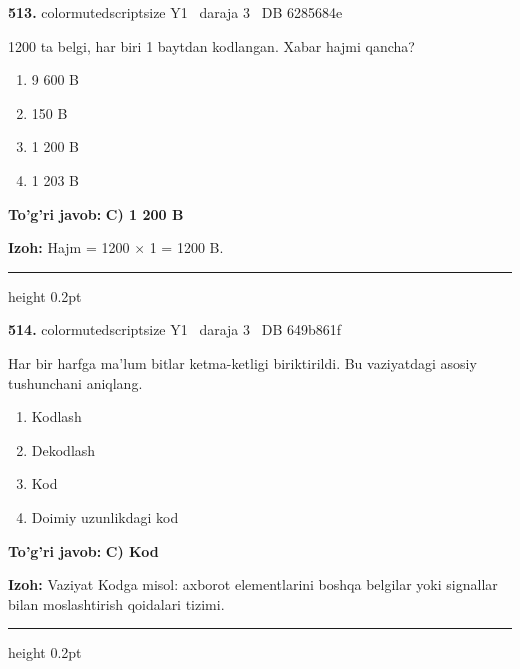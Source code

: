 \documentclass[10pt,a4paper,oneside]{article}
\begin{document}
\noindent\textbf{\color{ink}513.}  {color{muted}scriptsize Y1 \textbullet\ daraja 3 \textbullet\ DB 6285684e}
\par
1200 ta belgi, har biri 1 baytdan kodlangan. Xabar hajmi qancha?
\begin{enumerate}[label=\Alph*),leftmargin=9mm]
\item 9 600 B
\item 150 B
\item 1 200 B
\item 1 203 B
\end{enumerate}
\begin{tcolorbox}[enhanced,breakable,colback=teal!4,colframe=teal!50!black,boxrule=0.5pt,arc=1.1mm,left=3mm,right=3mm,top=1.7mm,bottom=1.7mm,before skip=2mm,after skip=2mm]
\textbf{\color{teal}To'g'ri javob:} \textbf{C) 1 200 B}
\par\smallskip
\textbf{Izoh:} Hajm = 1200 \ensuremath{\times} 1 = 1200 B.
\end{tcolorbox}
\vspace{2mm}\hrule height 0.2pt \vspace{3mm}

\noindent\textbf{\color{ink}514.}  {color{muted}scriptsize Y1 \textbullet\ daraja 3 \textbullet\ DB 649b861f}
\par
Har bir harfga ma'lum bitlar ketma-ketligi biriktirildi. Bu vaziyatdagi asosiy tushunchani aniqlang.
\begin{enumerate}[label=\Alph*),leftmargin=9mm]
\item Kodlash
\item Dekodlash
\item Kod
\item Doimiy uzunlikdagi kod
\end{enumerate}
\begin{tcolorbox}[enhanced,breakable,colback=teal!4,colframe=teal!50!black,boxrule=0.5pt,arc=1.1mm,left=3mm,right=3mm,top=1.7mm,bottom=1.7mm,before skip=2mm,after skip=2mm]
\textbf{\color{teal}To'g'ri javob:} \textbf{C) Kod}
\par\smallskip
\textbf{Izoh:} Vaziyat Kodga misol: axborot elementlarini boshqa belgilar yoki signallar bilan moslashtirish qoidalari tizimi.
\end{tcolorbox}
\vspace{2mm}\hrule height 0.2pt \vspace{3mm}
\end{document}
